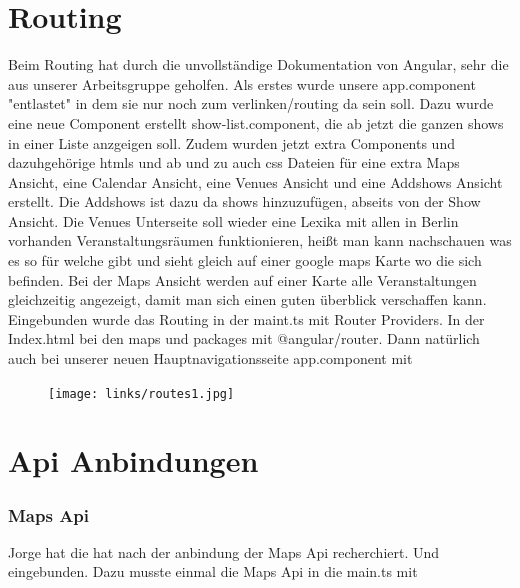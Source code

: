 \documentclass[12pt,titlepage]{article}
\begin{document}
\part{Routing}
Beim Routing hat durch die unvollständige Dokumentation von Angular, sehr die aus unserer Arbeitsgruppe geholfen. Als erstes wurde unsere app.component "entlastet" in dem sie nur noch zum verlinken/routing da sein soll. Dazu wurde eine neue Component erstellt show-list.component, die ab jetzt die ganzen shows in einer Liste anzgeigen soll. 
\newline
\newline
Zudem wurden jetzt extra Components und dazuhgehörige htmls und ab und zu auch css Dateien für eine extra Maps Ansicht, eine Calendar Ansicht, eine Venues Ansicht und eine Addshows Ansicht erstellt. Die Addshows ist dazu da shows hinzuzufügen, abseits von der Show Ansicht. 
\newline
\newline
Die Venues Unterseite soll wieder eine Lexika mit allen in Berlin vorhanden Veranstaltungsräumen funktionieren, heißt man kann nachschauen was es so für welche gibt und sieht gleich auf einer google maps Karte wo die sich befinden.
\newline
\newline
Bei der Maps Ansicht werden auf einer Karte alle Veranstaltungen gleichzeitig angezeigt, damit man sich einen guten überblick verschaffen kann.
\newline
\newline
Eingebunden wurde das Routing in der maint.ts mit Router Providers. In der Index.html bei den maps und packages mit  @angular/router. Dann natürlich auch bei unserer neuen Hauptnavigationsseite app.component mit 

\begin{figure}[h]
\begin{center}
\texttt{[image: links/routes1.jpg]}
\label{scene_intro_scale}
\end{center}
\end{figure}

\newpage
\part{Api Anbindungen}
\section{Maps Api}
Jorge hat die hat nach der anbindung der Maps Api recherchiert. Und eingebunden. Dazu musste einmal die Maps Api in die main.ts mit
\end{document}
